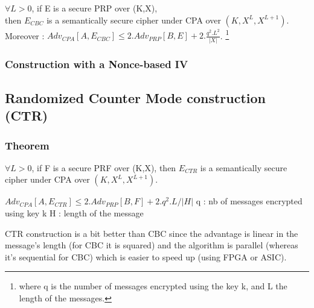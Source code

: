 \begin{mytheorem}
   $\forall L>0$, if E is a secure PRP over (K,X), \\
   then $E_{CBC}$ is a semantically secure cipher under CPA over $(K,X^L,X^{L+1})$. \\
 	Moreover : $Adv_{CPA}[A,E_{CBC}] \leq 2.Adv_{PRP}[B,E] + 2.\frac{q^2.L^2}{|X|} $. \footnote{where q is the number of messages encrypted using the key k, and L the length of the messages.}
\end{mytheorem}

\subsubsection{Construction with a Nonce-based IV}

\subsection{Randomized Counter Mode construction (CTR)}


\subsubsection{Theorem}

$\forall L>0$, if F is a secure PRF over (K,X), then $E_{CTR}$ is a semantically secure cipher under CPA over $(K,X^L,X^{L+1})$.

$Adv_{CPA}[A,E_{CTR}] \leq 2.Adv_{PRP}[B,F] + 2.q^2.L/|H| $
q : nb of messages encrypted using key k
H : length of the message

CTR construction is a bit better than CBC since the advantage is linear in the message's length (for CBC it is squared) and the algorithm is parallel (whereas it's sequential for CBC) which is easier to speed up (using FPGA or ASIC).





